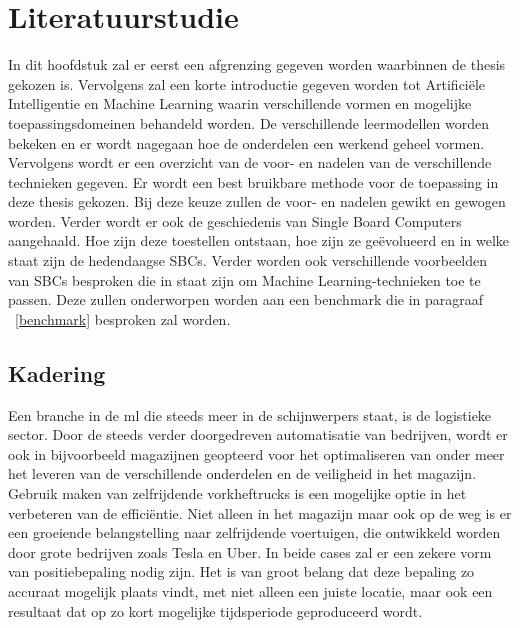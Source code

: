 \chapter{Literatuurstudie} \label{ch:literatuurstudie}

In dit hoofdstuk zal er eerst een afgrenzing gegeven worden waarbinnen de thesis gekozen is. Vervolgens zal een korte introductie gegeven worden tot Artifici\"ele Intelligentie en Machine Learning waarin verschillende vormen en mogelijke toepassingsdomeinen behandeld worden. De verschillende leermodellen worden bekeken en er wordt nagegaan hoe de onderdelen een werkend geheel vormen. Vervolgens wordt er een overzicht van de voor- en nadelen van de verschillende technieken gegeven. Er wordt een best bruikbare methode voor de toepassing in deze thesis gekozen. Bij deze keuze zullen de voor- en nadelen gewikt en gewogen worden. Verder wordt er ook de geschiedenis van Single Board Computers aangehaald. Hoe zijn deze toestellen ontstaan, hoe zijn ze ge\"evolueerd en in welke staat zijn de hedendaagse SBCs. Verder worden ook verschillende voorbeelden van SBCs besproken die in staat zijn om Machine Learning-technieken toe te passen. Deze zullen onderworpen worden aan een benchmark die in paragraaf ~\ref{benchmark} besproken zal worden.


\newpage

\section{Kadering}

Een branche in de \gls{ml} die steeds meer in de schijnwerpers staat, is de logistieke sector\cite{barreto2017industry}. Door de steeds verder doorgedreven automatisatie van bedrijven, wordt er ook in bijvoorbeeld magazijnen geopteerd voor het optimaliseren van onder meer het leveren van de verschillende onderdelen en de veiligheid in het magazijn. Gebruik maken van zelfrijdende vorkheftrucks is een mogelijke optie in het verbeteren van de effici\"entie. Niet alleen in het magazijn maar ook op de weg is er een groeiende belangstelling naar zelfrijdende voertuigen, die ontwikkeld worden door grote bedrijven zoals Tesla en Uber. In beide cases zal er een zekere vorm van positiebepaling nodig zijn. Het is van groot belang dat deze bepaling zo accuraat mogelijk plaats vindt, met niet alleen een juiste locatie, maar ook een resultaat dat op zo kort mogelijke tijdsperiode geproduceerd wordt. 

